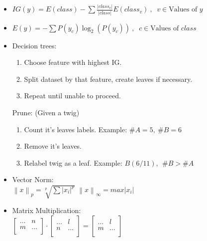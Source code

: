 \documentclass[twocolumn, 10pt]{article}
\begin{document}
\begin{itemize}[leftmargin=*, itemsep=0pt]
    \item $\displaystyle IG(y)=E(class)-\sum\frac{|class_v|}{|class|}E(class_v)\ , \;\;
           v \in \mbox{Values of } y$

    \item $\displaystyle E(y)=-\sum P(y_c)\log_2 (P(y_c))\ , \;\; 
           c \in \mbox{Values of } class$

    \item Decision trees:
    \begin{enumerate}[topsep=0pt, itemsep=0pt]
        \item Choose feature with highest IG.
        \item Split dataset by that feature, create leaves if necessary.
        \item Repeat until unable to proceed.
    \end{enumerate}
    Prune: (Given a twig)
    \begin{enumerate}[topsep=0pt, itemsep=0pt]
        \item Count it's leaves labels. \; Example: $\#A=5, \ \#B=6$
        \item Remove it's leaves.
        \item Relabel twig as a leaf. \; Example: $B(6/11), \ \ \#B>\#A$ 
    \end{enumerate}

    \item Vector Norm: \\[2pt]
    $\displaystyle\left\lVert x\right\rVert _p=\sqrt[p]{\sum\left\lvert x_i\right\rvert ^p}$ \;\;\;\;\; $\displaystyle\left\lVert x\right\rVert _\infty=max \left\lvert x_i\right\rvert$

    \newpage
    \item Matrix Multiplication: \\[3pt]
    $\begin{bmatrix}
        \ldots & n \\
        m & \ldots \\
    \end{bmatrix} \cdot
    \begin{bmatrix}
        \ldots & l \\
        n & \ldots \\
    \end{bmatrix} =
    \begin{bmatrix}
        \ldots  & l \\
        m  & \ldots \\
    \end{bmatrix}$


\end{itemize}
\end{document}
